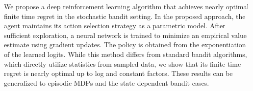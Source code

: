 We propose a deep reinforcement learning algorithm that achieves nearly optimal finite time regret in the stochastic bandit setting. In the proposed approach, the agent maintains its action selection strategy as a parametric model. After sufficient exploration, a neural network is trained to minimize an empirical value estimate using gradient updates. The policy is obtained from the exponentiation of the learned logits. While this method differs from standard bandit algorithms, which directly utilize statistics from sampled data, we show that its finite time regret is nearly optimal up to log and constant factors. These results can be generalized to episodic MDPs and the state dependent bandit cases.